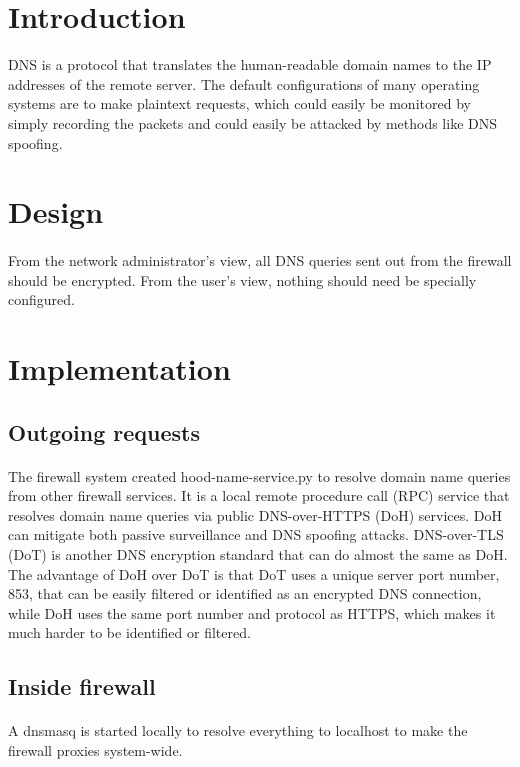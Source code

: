 \documentclass[mscthesis]{usiinfthesis}
\begin{document}
\section{Introduction}
DNS is a protocol that translates the human-readable domain names to the IP addresses of the remote server. The default configurations of many operating systems are to make plaintext requests, which could easily be monitored by simply recording the packets and could easily be attacked by methods like DNS spoofing.

\section{Design}
\paragraph{}
From the network administrator's view, all DNS queries sent out from the firewall should be encrypted. From the user's view, nothing should need be specially configured.

\section{Implementation}
\subsection{Outgoing requests}
\paragraph{}
The firewall system created hood-name-service.py to resolve domain name queries from other firewall services. It is a local remote procedure call (RPC) service that resolves domain name queries via public DNS-over-HTTPS (DoH) services. DoH can mitigate both passive surveillance and DNS spoofing attacks\citep{rfc:doh8}. DNS-over-TLS (DoT) is another DNS encryption standard that can do almost the same as DoH. The advantage of DoH over DoT is that DoT uses a unique server port number, 853, that can be easily filtered or identified as an encrypted DNS connection, while DoH uses the same port number and protocol as HTTPS, which makes it much harder to be identified or filtered.
\subsection{Inside firewall}
\paragraph{}
A dnsmasq is started locally to resolve everything to localhost to make the firewall proxies system-wide.
\end{document}

